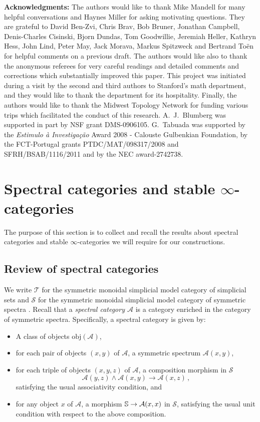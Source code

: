 \documentclass{amsart}
\renewcommand{\to}{\mathchoice{\longrightarrow}{\rightarrow}{\rightarrow}{\rightarrow}}
\newcommand{\cA}{{\mathcal A}}
\let\catsymbfont\mathcal
\newcommand{\aT}{{\catsymbfont{T}}}
\newcommand{\bS}{\mathbb{S}}
\newcommand{\Spt}{\mathcal{S}}%
\newcommand{\too}{\longrightarrow}%
\renewcommand{\i}{\infty}
\numberwithin{equation}{section}
\theoremstyle{definition}
\begin{document}
\noindent\textbf{Acknowledgments:} The authors would like to thank
Mike Mandell for many helpful conversations and Haynes Miller for
asking motivating questions.  They are grateful to David Ben-Zvi,
Chris Brav, Bob Bruner, Jonathan Campbell, Denis-Charles Cisinski,
Bjorn Dundas, Tom Goodwillie, Jeremiah Heller, Kathryn Hess, John
Lind, Peter May, Jack Morava, Markus Spitzweck and Bertrand To\"en for
helpful comments on a previous draft.  The authors would like also to
thank the anonymous referees for very careful readings and detailed
comments and corrections which substantially improved this paper.
This project was initiated during a visit by the second and third
authors to Stanford's math department, and they would like to thank
the department for its hospitality.  Finally, the authors would like
to thank the Midwest Topology Network for funding various trips which
facilitated the conduct of this research.  A.~J.~Blumberg was
supported in part by NSF grant DMS-0906105.  G.~Tabuada was supported by the {\em Estimulo {\`a} Investiga{\c c}{\~a}o} Award 2008 - 
Calouste Gulbenkian Foundation, by the FCT-Portugal grants PTDC/MAT/098317/2008 and SFRH/BSAB/1116/2011 and by the NEC award-2742738.

\section{Spectral categories and stable $\i$-categories}

The purpose of this section is to collect and recall the results about
spectral categories and stable $\i$-categories we will require for our
constructions.

\subsection{Review of spectral categories}\label{sub:spectralR}
We write $\aT$ for the symmetric monoidal simplicial model category of simplicial sets and $\Spt$ for the symmetric monoidal simplicial model category
of symmetric spectra \cite{HSS}.  Recall that a {\em
spectral category $\cA$} is a category 
enriched in the category of symmetric spectra.  Specifically, a
spectral category is given by:
\begin{itemize}
\item A class of objects $\mbox{obj}(\cA)$,
\item for each pair of objects $(x,y)$ of $\cA$, a symmetric
spectrum $\cA(x,y)$,
\item for each triple of objects $(x,y,z)$ of $\cA$, a composition
morphism in $\Spt$ $$\cA(y,z)\wedge \cA(x,y) \too \cA(x,z)\,,$$
satisfying the usual associativity condition, and
\item for any object $x$ of $\cA$, a morphism $\bS \to \cA(x,x)$
in $\Spt$, satisfying the usual unit condition with respect to the
above composition.
\end{itemize}
\end{document}
